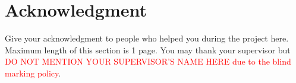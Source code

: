 \section*{Acknowledgment}
\vspace{-\baselineskip}
{\fontsize{12pt}{18pt}\selectfont 

Give your acknowledgment to people who helped you during the project here. Maximum length of this section is 1 page. You may thank your supervisor but \textcolor{red}{DO NOT MENTION YOUR SUPERVISOR’S NAME HERE due to the blind marking policy}.

}